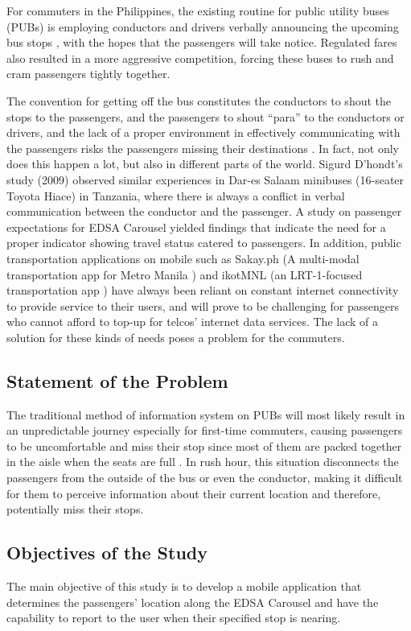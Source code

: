 \documentclass[journal]{./IEEE/IEEEtran}
\begin{document}
For commuters in the Philippines, the existing routine for public utility buses (PUBs) is employing conductors and drivers verbally announcing the upcoming bus stops \cite{Ref:004}, with the hopes that the passengers will take notice. Regulated fares also resulted in a more aggressive competition, forcing these buses to rush and cram passengers tightly together.

The convention for getting off the bus constitutes the conductors to shout the stops to the passengers, and the passengers to shout “para” to the conductors or drivers, and the lack of a proper environment in effectively communicating with the passengers risks the passengers missing their destinations \cite{Ref:002}.  In fact, not only does this happen a lot, but also in different parts of the world. Sigurd D’hondt’s study (2009) observed similar experiences in Dar-es Salaam minibuses (16-seater Toyota Hiace) in Tanzania, where there is always a conflict in verbal communication between the conductor and the passenger.
A study on passenger expectations for EDSA Carousel \cite{Ref:001} yielded findings that indicate the need for a proper indicator showing travel status catered to passengers. In addition, public transportation applications on mobile such as Sakay.ph (A multi-modal transportation app for Metro Manila \cite{Ref:015}) and ikotMNL (an LRT-1-focused transportation app \cite{Ref:008}) have always been reliant on constant internet connectivity to provide service to their users, and will prove to be challenging for passengers who cannot afford to top-up for telcos’ internet data services. The lack of a solution for these kinds of needs poses a problem for the commuters.


\subsection{Statement of the Problem}
The traditional method of information system on PUBs will most likely result in an unpredictable journey especially for first-time commuters, causing passengers to be uncomfortable and miss their stop since most of them are packed together in the aisle when the seats are full \cite{Ref:004}.
In rush hour, this situation disconnects the passengers from the outside of the bus or even the conductor, making it difficult for them to perceive information about their current location and therefore, potentially miss their stops.

\subsection{Objectives of the Study}
The main objective of this study is to develop a mobile application that determines the passengers’ location along the EDSA Carousel and have the capability to report to the user when their specified stop is nearing.
\end{document}
